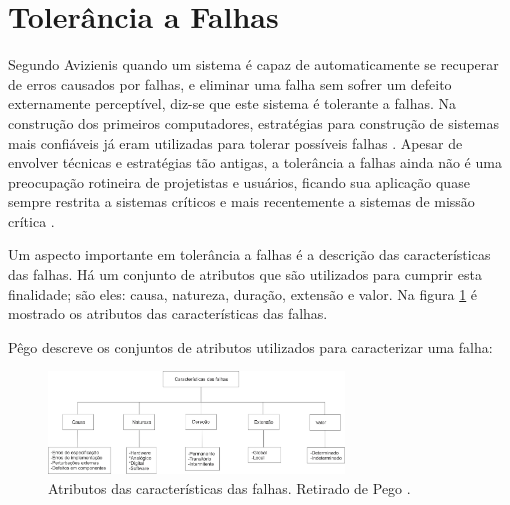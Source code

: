 \section{Tolerância a Falhas} \label{sec:tolerancia}

Segundo Avizienis \cite{Avizienis:1984} quando um sistema é capaz de automaticamente se recuperar de erros causados por falhas, e eliminar uma falha sem sofrer um defeito externamente perceptível, diz-se que este sistema é tolerante a falhas. Na construção dos primeiros computadores, estratégias para construção de sistemas mais confiáveis já eram utilizadas para tolerar possíveis falhas \cite{VonNewmann:1956}. Apesar de envolver técnicas e estratégias tão antigas, a tolerância a falhas ainda não é uma preocupação rotineira de projetistas e usuários, ficando sua aplicação quase sempre restrita a sistemas críticos e mais recentemente a sistemas de missão crítica \cite{Weber:2002}.

Um aspecto importante em tolerância a falhas é a descrição das características das falhas. Há um conjunto de atributos que são utilizados para cumprir esta finalidade; são eles: causa, natureza, duração, extensão e valor. Na figura \ref{Img:falhasCaracteristicas} é mostrado os atributos das características das falhas.

Pêgo \cite{Pego:2014} descreve os conjuntos de atributos utilizados para caracterizar uma falha:

\begin{figure}[H]
	\centering
	\includegraphics[width=0.7\textwidth]{figuras/falhasCaracteristicas.jpg}
	\caption[Características das Falhas]{Atributos das características das falhas. Retirado de Pego \cite{Pego:2014}.}
	\label{Img:falhasCaracteristicas}	
\end{figure}

